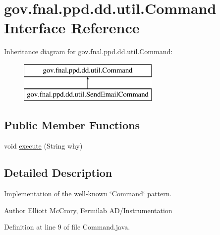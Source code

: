 \hypertarget{interfacegov_1_1fnal_1_1ppd_1_1dd_1_1util_1_1Command}{\section{gov.\-fnal.\-ppd.\-dd.\-util.\-Command Interface Reference}
\label{interfacegov_1_1fnal_1_1ppd_1_1dd_1_1util_1_1Command}
}
Inheritance diagram for gov.\-fnal.\-ppd.\-dd.\-util.\-Command\-:\begin{figure}[H]
\begin{center}
\leavevmode
\includegraphics[height=2.000000cm]{interfacegov_1_1fnal_1_1ppd_1_1dd_1_1util_1_1Command}
\end{center}
\end{figure}
\subsection*{Public Member Functions}
\begin{DoxyCompactItemize}
\item 
void \hyperlink{interfacegov_1_1fnal_1_1ppd_1_1dd_1_1util_1_1Command_ab87f8aecb39b9d9697d1ccad54603116}{execute} (String why)
\end{DoxyCompactItemize}


\subsection{Detailed Description}
Implementation of the well-\/known \char`\"{}\-Command\char`\"{} pattern.

\begin{DoxyAuthor}{Author}
Elliott Mc\-Crory, Fermilab A\-D/\-Instrumentation 
\end{DoxyAuthor}


Definition at line 9 of file Command.\-java.




